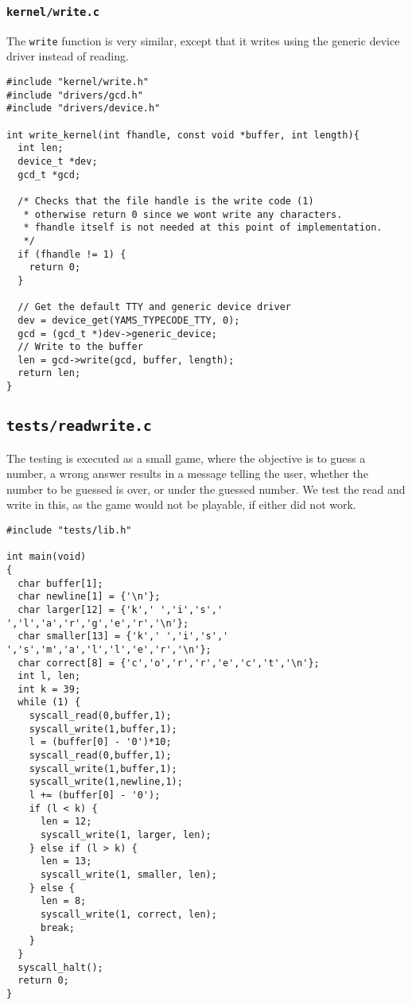 \documentclass[a4paper,12pt]{article}
\begin{document}
\subsubsection{\texttt{kernel/write.c} }
The \texttt{write} function is very similar, except that it writes using the generic device driver instead of reading.

\begin{lstlisting}
#include "kernel/write.h"
#include "drivers/gcd.h"
#include "drivers/device.h"

int write_kernel(int fhandle, const void *buffer, int length){
  int len;
  device_t *dev;
  gcd_t *gcd;

  /* Checks that the file handle is the write code (1)
   * otherwise return 0 since we wont write any characters.
   * fhandle itself is not needed at this point of implementation.
   */
  if (fhandle != 1) {
    return 0;
  }

  // Get the default TTY and generic device driver
  dev = device_get(YAMS_TYPECODE_TTY, 0);
  gcd = (gcd_t *)dev->generic_device;
  // Write to the buffer
  len = gcd->write(gcd, buffer, length);
  return len;
}
\end{lstlisting}

\subsection{\texttt{tests/readwrite.c}}
The testing is executed as a small game, where the objective is to guess a number, a wrong answer results in a message telling the user, whether the number to be guessed is over, or under the guessed number. We test the read and write in this, as the game would not be playable, if either did not work.
\begin{lstlisting}
#include "tests/lib.h"

int main(void)
{
  char buffer[1];
  char newline[1] = {'\n'};
  char larger[12] = {'k',' ','i','s',' ','l','a','r','g','e','r','\n'};
  char smaller[13] = {'k',' ','i','s',' ','s','m','a','l','l','e','r','\n'};
  char correct[8] = {'c','o','r','r','e','c','t','\n'};
  int l, len;
  int k = 39;
  while (1) {
    syscall_read(0,buffer,1);
    syscall_write(1,buffer,1);
    l = (buffer[0] - '0')*10;
    syscall_read(0,buffer,1);
    syscall_write(1,buffer,1);
    syscall_write(1,newline,1);
    l += (buffer[0] - '0');
    if (l < k) {
      len = 12;
      syscall_write(1, larger, len);
    } else if (l > k) { 
      len = 13;
      syscall_write(1, smaller, len);
    } else {
      len = 8;
      syscall_write(1, correct, len);
      break;
    }
  }
  syscall_halt();
  return 0;
}
\end{lstlisting}
\end{document}
